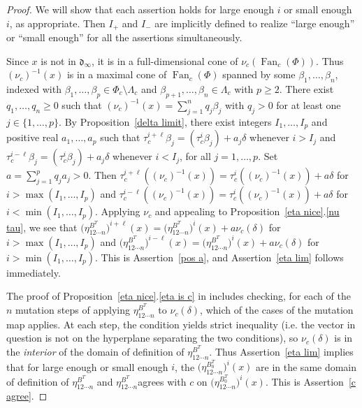 \documentclass{amsart}
\theoremstyle{definition}
\theoremstyle{remark}
\numberwithin{equation}{section}
\newcommand{\set}[1]{{\lbrace #1 \rbrace}}
\newcommand{\0}{{\mathbf{0}}}
\newcommand{\Fan}{\operatorname{Fan}}
\renewcommand{\d}{{\mathfrak d}}
\newcommand{\RSChar}{\Phi}
\newcommand{\RS}{\RSChar}
\newcommand{\AP}[1]{\RS_{#1}}
\newcommand{\APTChar}{\Lambda}
\newcommand{\APT}[1]{\APTChar_{#1}}
\begin{document}
\begin{proof}
We will show that each assertion holds for large enough $i$ or small enough~$i$, as appropriate.
Then $I_+$ and $I_-$ are implicitly defined to realize ``large enough'' or ``small enough'' for all the assertions simultaneously.

Since $x$ is not in $\d_\infty$, it is in a full-dimensional cone of $\nu_c(\Fan_c(\RS))$.
Thus $(\nu_c)^{-1}(x)$ is in a maximal cone of $\Fan_c(\RS)$ spanned by some $\beta_1,\ldots,\beta_n$, indexed with $\beta_1,\ldots,\beta_p\in\AP{c}\setminus\APT{c}$ and $\beta_{p+1},\ldots,\beta_n\in\APT{c}$ with $p\ge2$.
There exist $q_1,\ldots,q_n\ge0$ such that $(\nu_c)^{-1}(x)=\sum_{j=1}^nq_j\beta_j$ with $q_j>0$ for at least one $j\in\set{1,\ldots,p}$.
By Proposition~\ref{delta limit}, there exist integers $I_1,\ldots,I_p$ and positive real $a_1,\ldots,a_p$ such that $\tau_c^{i+\ell}\beta_j=(\tau_c^i\beta_j)+a_j\delta$ whenever $i>I_j$ and $\tau_c^{i-\ell}\beta_j=(\tau_c^i\beta_j)+a_j\delta$ whenever $i<I_j$, for all $j=1,\ldots,p$.
Set $a=\sum_{j=1}^p q_ja_j>0$.
Then $\tau_c^{i+\ell}((\nu_c)^{-1}(x))=\tau_c^i((\nu_c)^{-1}(x))+a\delta$ for $i>\max(I_1,\ldots,I_p)$ and $\tau_c^{i-\ell}((\nu_c)^{-1}(x))=\tau_c^i((\nu_c)^{-1}(x))+a\delta$ for $i<\min(I_1,\ldots,I_p)$.
Applying $\nu_c$ and appealing to Proposition~\ref{eta nice}.\ref{nu tau}, we see that $\bigl(\eta_{12\cdots n}^{B^T}\bigr)^{i+\ell}(x)=\bigl(\eta_{12\cdots n}^{B^T}\bigr)^i(x)+a\nu_c(\delta)$ for $i>\max(I_1,\ldots,I_p)$ and $\bigl(\eta_{12\cdots n}^{B^T}\bigr)^{i-\ell}(x)=\bigl(\eta_{12\cdots n}^{B^T}\bigr)^i(x)+a\nu_c(\delta)$ for $i>\min(I_1,\ldots,I_p)$.
This is Assertion~\ref{pos a}, and Assertion~\ref{eta lim} follows immediately.

The proof of Proposition~\ref{eta nice}.\ref{eta is c} in \cite[Proposition~7.33]{affscat} includes checking, for each of the $n$ mutation steps of applying $\eta^{B^T}_{12\cdots n}$ to $\nu_c(\delta)$, which of the cases of the mutation map applies.
At each step, the condition yields strict inequality (i.e. the vector in question is not on the hyperplane separating the two conditions), so $\nu_c(\delta)$ is in the \emph{interior} of the domain of definition of $\eta^{B^T}_{12\cdots n}$.
Thus Assertion~\ref{eta lim} implies that for large enough or small enough $i$, the $\bigl(\eta_{12\cdots n}^{B_0^T}\bigr)^i(x)$ are in the same domain of definition of $\eta^{B^T}_{12\cdots n}$ and $\eta^{B^T}_{12\cdots n}$agrees with $c$ on $\bigl(\eta_{12\cdots n}^{B_0^T}\bigr)^i(x)$.
This is Assertion~\ref{c agree}.


\end{proof}
\end{document}
